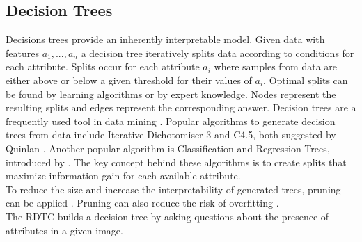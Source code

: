 \documentclass[a4paper,cleardoubleempty,BCOR1cm, 11pt]{report}
\begin{document}
\subsection{Decision Trees}
Decisions trees provide an inherently interpretable model. Given data with features $a_1, ..., a_n$ a decision tree iteratively splits data according to conditions for each attribute. Splits occur for each attribute $a_i$ where samples from data are either above or below a given threshold for their values of $a_i$. Optimal splits can be found by learning algorithms or by expert knowledge. Nodes represent the resulting splits and edges represent the corresponding answer.
Decision trees are a frequently used tool in data mining \cite{wu2008top}. Popular algorithms to generate decision trees from data include Iterative Dichotomiser 3 and C4.5, both suggested by Quinlan \cite{quinlan1986induction,quinlan2014c4}.
Another popular algorithm is Classification and Regression Trees, introduced by \citet{breiman1984classification}. The key concept behind these algorithms is to create splits that maximize information gain for each available attribute.\\
To reduce the size and increase the interpretability of generated trees, pruning can be applied \cite{mingers1989empirical}. Pruning can also reduce the risk of overfitting \cite{kearns1998fast}.\\
The RDTC builds a decision tree by asking questions about the presence of attributes in a given image. %
\end{document}
